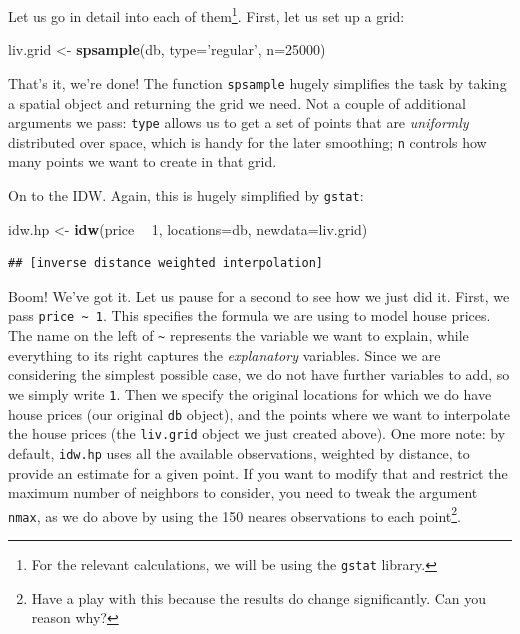 \documentclass[]{book}
\newenvironment{Shaded}{\begin{snugshade}}{\end{snugshade}}
\newcommand{\DataTypeTok}[1]{\textcolor[rgb]{0.13,0.29,0.53}{#1}}
\newcommand{\DecValTok}[1]{\textcolor[rgb]{0.00,0.00,0.81}{#1}}
\newcommand{\KeywordTok}[1]{\textcolor[rgb]{0.13,0.29,0.53}{\textbf{#1}}}
\newcommand{\NormalTok}[1]{#1}
\newcommand{\OperatorTok}[1]{\textcolor[rgb]{0.81,0.36,0.00}{\textbf{#1}}}
\newcommand{\StringTok}[1]{\textcolor[rgb]{0.31,0.60,0.02}{#1}}
\let\rmarkdownfootnote\footnote%
\def\footnote{\protect\rmarkdownfootnote}
\begin{document}
Let us go in detail into each of them\footnote{For the relevant calculations, we will be using the \texttt{gstat} library.}. First, let us set up a grid:

\begin{Shaded}
\begin{Highlighting}[]
\NormalTok{liv.grid <-}\StringTok{ }\KeywordTok{spsample}\NormalTok{(db, }\DataTypeTok{type=}\StringTok{'regular'}\NormalTok{, }\DataTypeTok{n=}\DecValTok{25000}\NormalTok{)}
\end{Highlighting}
\end{Shaded}

That's it, we're done! The function \texttt{spsample} hugely simplifies the task by taking a spatial object and returning the grid we need. Not a couple of additional arguments we pass: \texttt{type} allows us to get a set of points that are \emph{uniformly} distributed over space, which is handy for the later smoothing; \texttt{n} controls how many points we want to create in that grid.

On to the IDW. Again, this is hugely simplified by \texttt{gstat}:

\begin{Shaded}
\begin{Highlighting}[]
\NormalTok{idw.hp <-}\StringTok{ }\KeywordTok{idw}\NormalTok{(price }\OperatorTok{~}\StringTok{ }\DecValTok{1}\NormalTok{, }\DataTypeTok{locations=}\NormalTok{db, }\DataTypeTok{newdata=}\NormalTok{liv.grid)}
\end{Highlighting}
\end{Shaded}

\begin{verbatim}
## [inverse distance weighted interpolation]
\end{verbatim}

Boom! We've got it. Let us pause for a second to see how we just did it. First, we pass \texttt{price\ \textasciitilde{}\ 1}. This specifies the formula we are using to model house prices. The name on the left of \texttt{\textasciitilde{}} represents the variable we want to explain, while everything to its right captures the \emph{explanatory} variables. Since we are considering the simplest possible case, we do not have further variables to add, so we simply write \texttt{1}. Then we specify the original locations for which we do have house prices (our original \texttt{db} object), and the points where we want to interpolate the house prices (the \texttt{liv.grid} object we just created above). One more note: by default, \texttt{idw.hp} uses all the available observations, weighted by distance, to provide an estimate for a given point. If you want to modify that and restrict the maximum number of neighbors to consider, you need to tweak the argument \texttt{nmax}, as we do above by using the 150 neares observations to each point\footnote{Have a play with this because the results do change significantly. Can you reason why?}.
\end{document}
